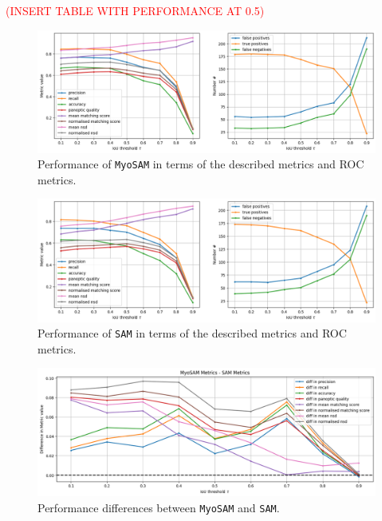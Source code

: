 \textcolor{red}{(INSERT TABLE WITH PERFORMANCE AT 0.5)}
\begin{figure}
	\centering
	\includegraphics[width=\textwidth]{"images/quantitative_performance_myosam.png"}
	\caption[Quantitative performance \texttt{MyoSAM}]{Performance of \texttt{MyoSAM} in terms of the described metrics and ROC metrics.}
	\label{figperfsam}
\end{figure}
\begin{figure}
	\centering
	\includegraphics[width=\textwidth]{"images/quantitative_performance_sam.png"}
	\caption[Quantitative performance \texttt{SAM}]{Performance of \texttt{SAM} in terms of the described metrics and ROC metrics.}
	\label{figperfsambase}
\end{figure}
\begin{figure}
	\centering
	\includegraphics[width=\textwidth]{"images/diff_quantitative_performance_myosam_sam.png"}
	\caption[Difference quantitative performance \texttt{SAM} and \texttt{MyoSAM}]{Performance differences between \texttt{MyoSAM} and \texttt{SAM}.}
	\label{figperfdiffsam}
\end{figure} 

